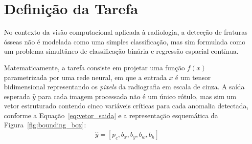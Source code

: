 \documentclass[12pt,oneside,a4paper,chapter=TITLE,section=TITLE,sumario=tradicional]{abntex2}
\begin{document}
\begin{codigo}[htb]
\caption{CONFIGURAÇÃO DO EXPERIMENTO BASELINE (FASE OFICIAL; SUBSET: 30 ÉPOCAS)}
\label{cod:baseline_yaml}

\end{codigo}

\begin{codigo}[htb]
\caption{CONFIGURAÇÃO DO EXPERIMENTO PROPOSTA (FASE OFICIAL; SUBSET: 30 ÉPOCAS)}
\label{cod:proposed_yaml}

\end{codigo}

\begin{codigo}[htb]
\caption{CHAMADA DE TREINAMENTO YOLO A PARTIR DO ARQUIVO DE CONFIGURAÇÃO}
\label{cod:treino}

\end{codigo}

\begin{codigo}[htb]
\caption{AVALIAÇÃO DO MODELO NO CONJUNTO DE TESTE}
\label{cod:avaliacao}

\end{codigo}

\section{Definição da Tarefa}
\label{sec:definicao_tarefa}

No contexto da visão computacional aplicada à radiologia, a detecção de fraturas ósseas não é modelada como uma simples classificação, mas sim formulada como um problema simultâneo de classificação binária e regressão espacial contínua.

Matematicamente, a tarefa consiste em projetar uma função $f(x)$ parametrizada por uma rede neural, em que a entrada $x$ é um tensor bidimensional representando os \textit{pixels} da radiografia em escala de cinza. A saída esperada $\hat{y}$ para cada imagem processada não é um único rótulo, mas sim um vetor estruturado contendo cinco variáveis críticas para cada anomalia detectada, conforme a Equação~\eqref{eq:vetor_saida} e a representação esquemática da Figura~\ref{fig:bounding_box}:
\begin{equation}
\label{eq:vetor_saida}
\hat{y} = [p_c, b_x, b_y, b_w, b_h]
\end{equation}
\end{document}
